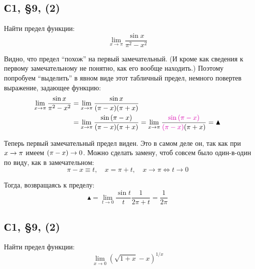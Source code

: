 \documentclass[a4paper,12pt]{article}
\begin{document}
  \subsection{С1, \S 9, (2)}

  Найти предел функции:
  \[
    \lim_{x \to \pi} \frac{\sin x}{\pi^2 - x^2}
  \]

  \begin{solution}
    Видно, что предел ``похож'' на первый замечательный.  %
    (И кроме как сведения к первому замечательному не понятно, как его вообще находить.)
    Поэтому попробуем ``выделить'' в явном виде этот табличный предел, немного повертев выражение, задающее функцию:
    \begin{equation*}
    \begin{split}
      \lim_{x \to \pi} \frac{\sin x}{\pi^2 - x^2}
        &= \lim_{x \to \pi} \frac{\sin x}{(\pi - x) (\pi + x)}\\
        &= \lim_{x \to \pi} \frac{\sin{(\pi - x)}}{(\pi - x) (\pi + x)}
        = \lim_{x \to \pi} \frac{\textcolor{pink}{\sin{(\pi - x)}}}{\textcolor{pink}{(\pi - x)} (\pi + x)}
        = \blacktriangle
    \end{split}
    \end{equation*}

    Теперь первый замечательный предел виден.
    Это в самом деле он, так как при $x \hm\to \pi$ имеем $(\pi \hm- x) \hm\to 0$.
    Можно сделать замену, чтоб совсем было один-в-один по виду, как в замечательном:
    \[
      \pi - x \equiv t,\quad x = \pi + t,\quad x \to \pi \Leftrightarrow t \to 0
    \]

    Тогда, возвращаясь к пределу:
    \[
      \blacktriangle = \lim_{t \to 0} \frac{\sin t}{t} \frac{1}{2 \pi + t}
        = \frac{1}{2 \pi}
    \]
  \end{solution}


  \subsection{С1, \S 9, (2)}

  Найти предел функции:
  \[
    \lim_{x \to 0} \left(\sqrt{1 + x} - x\right)^{1 / x}
  \]
\end{document}
